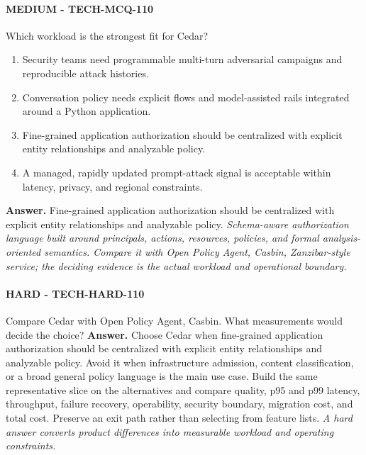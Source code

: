 \paragraph{MEDIUM - TECH-MCQ-110} Which workload is the strongest fit for Cedar?
\begin{enumerate}[label=\Alph*.]
\item Security teams need programmable multi-turn adversarial campaigns and reproducible attack histories.
\item Conversation policy needs explicit flows and model-assisted rails integrated around a Python application.
\item Fine-grained application authorization should be centralized with explicit entity relationships and analyzable policy.
\item A managed, rapidly updated prompt-attack signal is acceptable within latency, privacy, and regional constraints.
\end{enumerate}
\textbf{Answer.} Fine-grained application authorization should be centralized with explicit entity relationships and analyzable policy.
\textit{Schema-aware authorization language built around principals, actions, resources, policies, and formal analysis-oriented semantics. Compare it with Open Policy Agent, Casbin, Zanzibar-style service; the deciding evidence is the actual workload and operational boundary.}
\paragraph{HARD - TECH-HARD-110} Compare Cedar with Open Policy Agent, Casbin. What measurements would decide the choice?
\textbf{Answer.} Choose Cedar when fine-grained application authorization should be centralized with explicit entity relationships and analyzable policy. Avoid it when infrastructure admission, content classification, or a broad general policy language is the main use case. Build the same representative slice on the alternatives and compare quality, p95 and p99 latency, throughput, failure recovery, operability, security boundary, migration cost, and total cost. Preserve an exit path rather than selecting from feature lists.
\textit{A hard answer converts product differences into measurable workload and operating constraints.}

